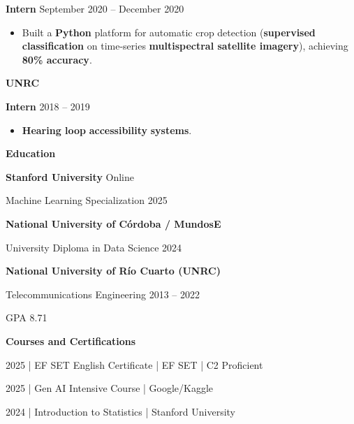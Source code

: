 \documentclass[11pt]{article}
\begin{document}
\textbf{Intern} \hfill September 2020 -- December 2020
\begin{itemize}[noitemsep, topsep=0pt, partopsep=0pt, parsep=0pt]
    \item Built a \textbf{Python} platform for automatic crop detection (\textbf{supervised classification} on time-series \textbf{multispectral satellite imagery}), achieving \textbf{80\% accuracy}.
\end{itemize}

\vspace{12pt}

\textbf{UNRC}

\textbf{Intern} \hfill 2018 -- 2019
\begin{itemize}[noitemsep, topsep=0pt, partopsep=0pt, parsep=0pt]
    \item \textbf{Hearing loop} \textbf{accessibility} \textbf{systems}.
\end{itemize}

\vspace{12pt}

\begin{center}
    \textbf{Education}
\end{center}

\textbf{Stanford University} \hfill Online

Machine Learning Specialization \hfill 2025

\vspace{12pt}

\textbf{National University of Córdoba / MundosE}

University Diploma in Data Science \hfill 2024

\vspace{12pt}

\textbf{National University of Río Cuarto (UNRC)}

Telecommunications Engineering \hfill 2013 -- 2022

GPA 8.71

\vspace{12pt}

\begin{center}
    \textbf{Courses and Certifications}
\end{center}

2025 | EF SET English Certificate | EF SET | C2 Proficient

2025 | Gen AI Intensive Course | Google/Kaggle

2024 | Introduction to Statistics | Stanford University
\end{document}
